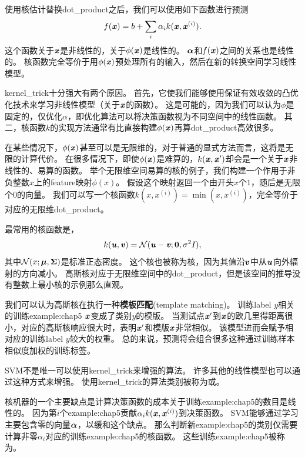 使用核估计替换\gls{dot_product}之后，我们可以使用如下函数进行预测
\begin{equation}
    f(\boldsymbol{\mathit{x}}) = b + \sum_i \alpha_i k(\boldsymbol{\mathit{x}}, \boldsymbol{\mathit{x}}^{(i)}) .
\end{equation}
这个函数关于$\boldsymbol{\mathit{x}}$是非线性的，关于$\phi(\boldsymbol{\mathit{x}})$是线性的。
$\boldsymbol{\alpha}$和$f(\boldsymbol{\mathit{x}})$之间的关系也是线性的。
核函数完全等价于用$\phi(\boldsymbol{\mathit{x}})$预处理所有的输入，然后在新的转换空间学习线性模型。

\gls{kernel_trick}十分强大有两个原因。
首先，它使我们能够使用保证有效收敛的凸优化技术来学习非线性模型（关于$\boldsymbol{\mathit{x}}$的函数）。
这是可能的，因为我们可以认为$\phi$是固定的，仅优化$\alpha$，即优化算法可以将决策函数视为不同空间中的线性函数。
其二，核函数$k$的实现方法通常有比直接构建$\phi(\boldsymbol{\mathit{x}})$再算\gls{dot_product}高效很多。

在某些情况下，$\phi(\boldsymbol{\mathit{x}})$甚至可以是无限维的，对于普通的显式方法而言，这将是无限的计算代价。
在很多情况下，即使$\phi(\boldsymbol{\mathit{x}})$是难算的，$k(\boldsymbol{\mathit{x}},\boldsymbol{\mathit{x}}')$却会是一个关于$\boldsymbol{\mathit{x}}$非线性的、易算的函数。
举个无限维空间易算的核的例子，我们构建一个作用于非负整数$x$上的\gls{feature}映射$\phi(x)$。
假设这个映射返回一个由开头$x$个$1$，随后是无限个$0$的向量。
我们可以写一个核函数$k(x,x^{(i)}) = \min(x, x^{(i)})$，完全等价于对应的无限维\gls{dot_product}。


最常用的核函数是，
\begin{equation}
    k(\boldsymbol{\mathit{u}}, \boldsymbol{\mathit{v}}) = \mathcal{N} (\boldsymbol{\mathit{u}} - \boldsymbol{\mathit{v}}; \mathbf{0}, \sigma^2 I) ,
\end{equation}
其中$\mathcal{N}(x; \boldsymbol{\mu}, \boldsymbol{\Sigma})$是标准正态密度。
这个核也被称为核，因为其值沿$\boldsymbol{\mathit{v}}$中从$\boldsymbol{\mathit{u}}$向外辐射的方向减小。
高斯核对应于无限维空间中的\gls{dot_product}，但是该空间的推导没有整数上最小核的示例那么直观。

我们可以认为高斯核在执行一种\textbf{模板匹配}(template matching)。
训练\gls{label} $y$相关的训练\gls{example:chap5} $\boldsymbol{\mathit{x}}$变成了类别$y$的模版。
当测试点$\boldsymbol{\mathit{x}}'$到$\boldsymbol{\mathit{x}}$的欧几里得距离很小，对应的高斯核响应很大时，表明$\boldsymbol{\mathit{x}}'$和模版$\boldsymbol{\mathit{x}}$非常相似。
该模型进而会赋予相对应的训练\gls{label} $y$较大的权重。
总的来说，预测将会组合很多这种通过训练样本相似度加权的训练标签。

\gls{SVM}不是唯一可以使用\gls{kernel_trick}来增强的算法。
许多其他的线性模型也可以通过这种方式来增强。
使用\gls{kernel_trick}的算法类别被称为或\citep{Williams+Rasmussen-nips8,SchBurSmo99}。    

核机器的一个主要缺点是计算决策函数的成本关于训练\gls{example:chap5}的数目是线性的。
因为第$i$个\gls{example:chap5}贡献$\alpha_i k(\boldsymbol{\mathit{x}}, \boldsymbol{\mathit{x}}^{(i)})$到决策函数。
\gls{SVM}能够通过学习主要包含零的向量$\boldsymbol{\alpha}$，以缓和这个缺点。
那么判断新\gls{example:chap5}的类别仅需要计算非零$\alpha_i$对应的训练\gls{example:chap5}的核函数。
这些训练\gls{example:chap5}被称为。

